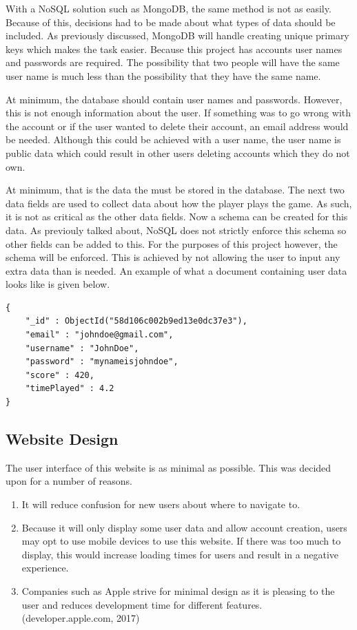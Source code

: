 \documentclass[12pt]{article}
\begin{document}
With a NoSQL solution such as MongoDB, the same method is not as easily. Because of this, decisions had to be made about what types of data should be included. As previously discussed, MongoDB will handle creating unique primary keys which makes the task easier. Because this project has accounts user names and passwords are required. The possibility that two people will have the same user name is much less than the possibility that they have the same name. 

At minimum, the database should contain user names and passwords. However, this is not enough information about the user. If something was to go wrong with the account or if the user wanted to delete their account, an email address would be needed. Although this could be achieved with a user name, the user name is public data which could result in other users deleting accounts which they do not own. 

At minimum, that is the data the must be stored in the database. The next two data fields are used to collect data about how the player plays the game. As such, it is not as critical as the other data fields. Now a schema can be created for this data. As previouly talked about, NoSQL does not strictly enforce this schema so other fields can be added to this. For the purposes of this project however, the schema will be enforced. This is achieved by not allowing the user to input any extra data than is needed. An example of what a document containing user data looks like is given below.

\begin{verbatim}
{
    "_id" : ObjectId("58d106c002b9ed13e0dc37e3"),
    "email" : "johndoe@gmail.com",
    "username" : "JohnDoe",
    "password" : "mynameisjohndoe",
    "score" : 420,
    "timePlayed" : 4.2
}
\end{verbatim} 

{\centering \subsection{Website Design}}
The user interface of this website is as minimal as possible. This was decided upon for a number of reasons.
 
\begin{enumerate}
\item It will reduce confusion for new users about where to navigate to.
\item Because it will only display some user data and allow account creation, users may opt to use mobile devices to use this website. If there was too much to display, this would increase loading times for users and result in a negative experience. 
\item Companies such as Apple strive for minimal design as it is pleasing to the user and reduces development time for different features. (developer.apple.com, 2017)
\end{enumerate}
\end{document}
